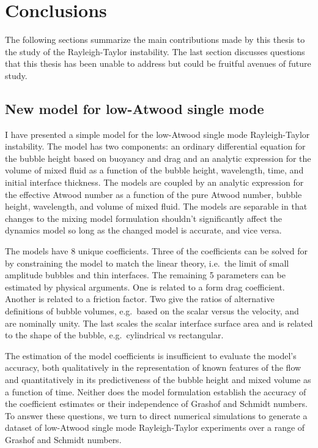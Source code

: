 \chapter{Conclusions}

The following sections summarize the main contributions made by this thesis to the study of the Rayleigh-Taylor instability.
The last section discusses questions that this thesis has been unable to address but could be fruitful avenues of future study.

\section{New model for low-Atwood single mode}
I have presented a simple model for the low-Atwood single mode Rayleigh-Taylor instability.
The model has two components: an ordinary differential equation for the bubble height based on buoyancy and drag and an analytic expression for the volume of mixed fluid as a function of the bubble height, wavelength, time, and initial interface thickness.
The models are coupled by an analytic expression for the effective Atwood number as a function of the pure Atwood number, bubble height, wavelength, and volume of mixed fluid.
The models are separable in that changes to the mixing model formulation shouldn't significantly affect the dynamics model so long as the changed model is accurate, and vice versa.

The models have 8 unique coefficients.
Three of the coefficients can be solved for by constraining the model to match the linear theory, i.e.\ the limit of small amplitude bubbles and thin interfaces.
The remaining 5 parameters can be estimated by physical arguments.
One is related to a form drag coefficient.
Another is related to a friction factor.
Two give the ratios of alternative definitions of bubble volumes, e.g.\ based on the scalar versus the velocity, and are nominally unity.
The last scales the scalar interface surface area and is related to the shape of the bubble, e.g.\ cylindrical vs rectangular.

The estimation of the model coefficients is insufficient to evaluate the model's accuracy, both qualitatively in the representation of known features of the flow and quantitatively in its predictiveness of the bubble height and mixed volume as a function of time.
Neither does the model formulation establish the accuracy of the coefficient estimates or their independence of Grashof and Schmidt numbers.
To answer these questions, we turn to direct numerical simulations to generate a dataset of low-Atwood single mode Rayleigh-Taylor experiments over a range of Grashof and Schmidt numbers.

